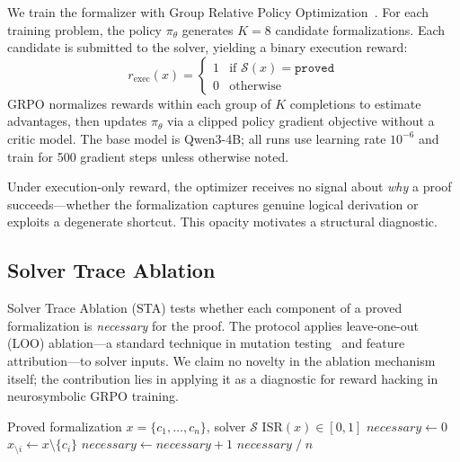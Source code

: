 We train the formalizer with Group Relative Policy Optimization~\citep[GRPO;][]{deepseekmath}.
For each training problem, the policy $\pi_\theta$ generates $K{=}8$ candidate formalizations.
Each candidate is submitted to the solver, yielding a binary execution reward:
\begin{equation}
  r_{\text{exec}}(x) =
  \begin{cases}
    1 & \text{if } \mathcal{S}(x) = \texttt{proved} \\
    0 & \text{otherwise}
  \end{cases}
  \label{eq:r_exec}
\end{equation}
GRPO normalizes rewards within each group of $K$ completions to estimate advantages, then updates $\pi_\theta$ via a clipped policy gradient objective without a critic model.
The base model is Qwen3-4B; all runs use learning rate $10^{-6}$ and train for 500 gradient steps unless otherwise noted.

Under execution-only reward, the optimizer receives no signal about \emph{why} a proof succeeds---whether the formalization captures genuine logical derivation or exploits a degenerate shortcut.
This opacity motivates a structural diagnostic.

\subsection{Solver Trace Ablation}
\label{sec:sta}

Solver Trace Ablation (STA) tests whether each component of a proved formalization is \emph{necessary} for the proof.
The protocol applies leave-one-out (LOO) ablation---a standard technique in mutation testing~\cite{demillo1978, jia-harman-survey} and feature attribution---to solver inputs.
We claim no novelty in the ablation mechanism itself; the contribution lies in applying it as a diagnostic for reward hacking in neurosymbolic GRPO training.

\begin{algorithm}[t]
\caption{Solver Trace Ablation (STA)}
\label{alg:sta}
\begin{algorithmic}[1]
\Require Proved formalization $x = \{c_1, \ldots, c_n\}$, solver $\mathcal{S}$
\Ensure $\text{ISR}(x) \in [0, 1]$
\State $\textit{necessary} \gets 0$
    \State $x_{\setminus i} \gets x \setminus \{c_i\}$
        \State $\textit{necessary} \gets \textit{necessary} + 1$
    \EndIf
\EndFor
\State \Return $\textit{necessary} \;/\; n$
\end{algorithmic}
\end{algorithm}

